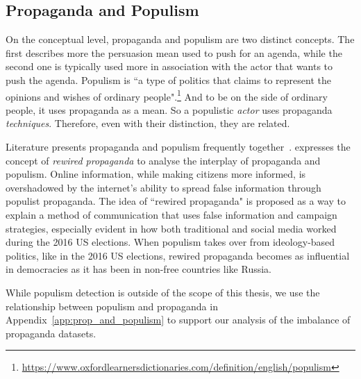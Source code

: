 \subsection{Propaganda and Populism}
\label{sec:lit_related_populism}

On the conceptual level, propaganda and populism are two distinct concepts. The first describes more the persuasion mean used to push for an agenda, while the second one is typically used more in association with the actor that wants to push the agenda. Populism is ``a type of politics that claims to represent the opinions and wishes of ordinary people".\footnote{\url{https://www.oxfordlearnersdictionaries.com/definition/english/populism}}
And to be on the side of ordinary people, it uses propaganda as a mean. So a populistic \emph{actor} uses propaganda \emph{techniques}. Therefore, even with their distinction, they are related.


Literature presents propaganda and populism frequently together~\citep{oates2021rewired,tumber2021routledge,pasquino2008populism}.
\citet{oates2021rewired} expresses the
concept of \emph{rewired propaganda} to analyse the interplay of propaganda and populism. Online information, while making citizens more informed, is overshadowed by the internet's ability to spread false information through populist propaganda.
The idea of ``rewired propaganda" is proposed as a way to explain a method of communication that uses false information and campaign strategies, especially evident in how both traditional and social media worked during the 2016 US elections.
When populism takes over from ideology-based politics, like in the 2016 US elections, rewired propaganda becomes as influential in democracies as it has been in non-free countries like Russia.

While populism detection is outside of the scope of this thesis, we use the relationship between populism and propaganda in Appendix~\ref{app:prop_and_populism} to support our analysis of the imbalance of propaganda datasets.


